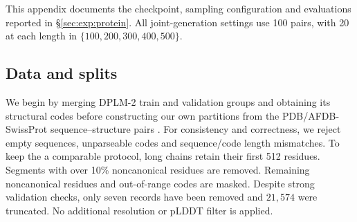 \begingroup
\raggedbottom

This appendix documents the checkpoint, sampling configuration and evaluations reported in \S\ref{sec:exp:protein}. All joint-generation settings use 100 pairs, with 20 at each length in $\{100,200,300,400,500\}$.

\subsection{Data and splits}
\label{app:protein:protocol}


We begin by merging DPLM-2 train and validation groups and obtaining its structural codes before constructing our own partitions from the PDB/AFDB-SwissProt sequence--structure pairs \citep{protein:dplm2, protein:pdb, protein:afdb}. For consistency and correctness, we reject empty sequences, unparseable codes and sequence/code length mismatches. To keep the a comparable protocol, long chains retain their first 512 residues. Segments with over 10\% noncanonical residues are removed. Remaining noncanonical residues and out-of-range codes are masked. Despite strong validation checks, only seven records have been removed and $21{,}574$ were truncated. No additional resolution or pLDDT filter is applied. 



